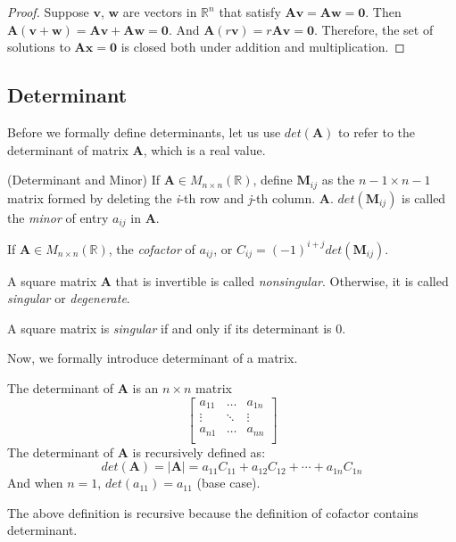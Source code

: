 \begin{proof}
Suppose $\bm{v}$, $\bm{w}$ are vectors in $\mathbb{R}^n$ that satisfy $\bm{Av}=\bm{Aw}=\bm{0}$. Then $\bm{A}(\bm{v}+\bm{w})=\bm{Av}+\bm{Aw}=\bm{0}$. And $\bm{A}(r\bm{v})=r\bm{Av}=\bm{0}$. Therefore, the set of solutions to $\bm{Ax}=\bm{0}$ is closed both under addition and multiplication.
\end{proof}

\subsection{Determinant}
Before we formally define determinants, let us use $det(\bm{A})$ to refer to the determinant of matrix $\bm{A}$, which is a real value.
\begin{definition}(Determinant and Minor)
If $\bm{A}\in M_{n\times n}(\mathbb{R})$, define $\bm{M}_{ij}$ as the $n-1\times n-1$ matrix formed by deleting the \textit{i}-th row and \textit{j}-th column. $\bm{A}$. $det(\bm{M}_{ij})$ is called the \emph{minor} of entry $a_{ij}$ in $\bm{A}$.
\end{definition}

\begin{definition}[Cofactor]
If $\bm{A}\in M_{n\times n}(\mathbb{R})$, the \emph{cofactor} of $a_{ij}$, or $C_{ij}=(-1)^{i+j}det(\bm{M}_{ij})$.
\end{definition}

\begin{definition}[Singularity]\label{def:singularity}
A square matrix $\bm{A}$ that is invertible is called \emph{nonsingular}. Otherwise, it is called \emph{singular} or \emph{degenerate}.
\end{definition}
\begin{theorem}
A square matrix is \emph{singular} if and only if its determinant is 0.
\end{theorem}

Now, we formally introduce determinant of a matrix.

\begin{definition}[Determinant]
The determinant of $\bm{A}$ is an $n\times n$ matrix
\[
    \begin{bmatrix}
    a_{11} & \dots & a_{1n}  \\
    \vdots & \ddots & \vdots \\
    a_{n1} & \dots & a_{nn}  \\
    \end{bmatrix}
\]
The determinant of $\bm{A}$ is recursively defined as:
\begin{equation}
    det(\bm{A}) =|\bm{A}|=a_{11}C_{11} + a_{12}C_{12} + \cdots + a_{1n}C_{1n}
\end{equation}
And when $n=1$, $det(a_{11})=a_{11}$ (base case).
\end{definition}
The above definition is recursive because the definition of cofactor contains determinant.

